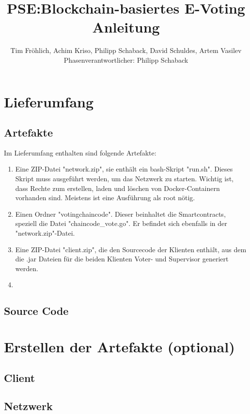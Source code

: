\documentclass[parskip=full]{scrartcl}
\title{
	PSE:Blockchain-basiertes E-Voting \\
	Anleitung
}
\author{Tim Fröhlich, Achim Kriso, Philipp Schaback, David Schuldes, Artem Vasilev\\ Phasenverantwortlicher: Philipp Schaback}
\begin{document}
	\clearpage
	\maketitle
	\newpage
	
	\tableofcontents
	\newpage
	
	\section{Lieferumfang}
	\subsection{Artefakte}
	Im Lieferumfang enthalten sind folgende Artefakte:
	\begin{enumerate}
  
		\item Eine ZIP-Datei "network.zip", sie enthält ein bash-Skript "run.sh". Dieses Skript muss ausgeführt werden, um das Netzwerk zu starten. Wichtig ist, dass Rechte zum erstellen, laden und löschen von Docker-Containern vorhanden sind. Meistens ist eine Ausführung als root nötig.
		\item Einen Ordner "votingchaincode". Dieser beinhaltet die Smartcontracts, speziell die Datei "chaincode_vote.go". Er befindet sich ebenfalls in der "network.zip"-Datei.
		\item Eine ZIP-Datei "client.zip", die den Sourcecode der Klienten enthält, aus dem die .jar Dateien für die beiden Klienten Voter- und Supervisor generiert werden.
		\item 
	\end{enumerate}

	\subsection{Source Code}
	
	
	\section{Erstellen der Artefakte (optional)}
	\subsection{Client}
	
	\subsection{Netzwerk}
	
\end{document}
